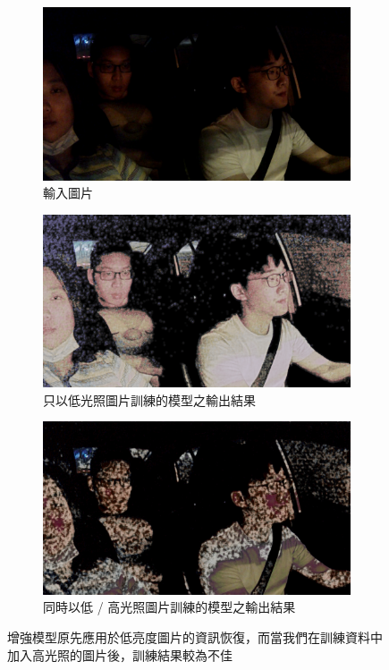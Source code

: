 \begin{figure}[htb]
\centering
\begin{subfigure}[b]{0.3\textwidth}
    \centering
    \includegraphics[width=\textwidth]{figures/ori_input}
    \caption{輸入圖片}
\end{subfigure}
\begin{subfigure}[b]{0.3\textwidth}
    \centering
    \includegraphics[width=\textwidth]{figures/dark_output}
    \caption{只以低光照圖片訓練的模型之輸出結果}
\end{subfigure}
\begin{subfigure}[b]{0.3\textwidth}
    \centering
    \includegraphics[width=\textwidth]{figures/both_output}
    \caption{同時以低 / 高光照圖片訓練的模型之輸出結果}
\end{subfigure}
\caption[訓練資料中含有高光照圖片與否之模型輸出結果比較]{增強模型原先應用於低亮度圖片的資訊恢復，而當我們在訓練資料中加入高光照的圖片後，訓練結果較為不佳}
\label{fig:train_compare}
\end{figure}

